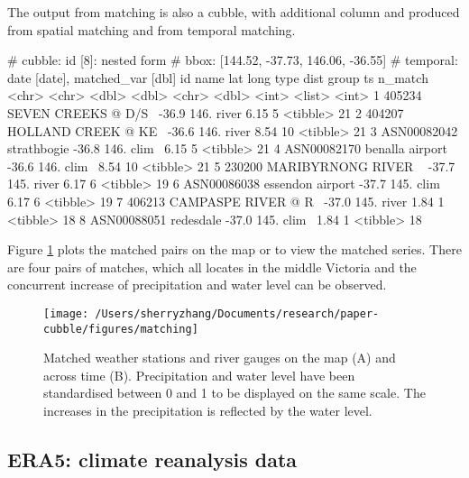 \documentclass[
]{jss}
\begin{document}
The output from matching is also a cubble, with additional column
 and  produced from spatial matching and
 from temporal matching.

\begin{CodeChunk}
\begin{CodeOutput}
# cubble:   id [8]: nested form
# bbox:     [144.52, -37.73, 146.06, -36.55]
# temporal: date [date], matched_var [dbl]
  id          name                  lat  long type   dist group ts       n_match
  <chr>       <chr>               <dbl> <dbl> <chr> <dbl> <int> <list>     <int>
1 405234      SEVEN CREEKS @ D/S~ -36.9  146. river  6.15     5 <tibble>      21
2 404207      HOLLAND CREEK @ KE~ -36.6  146. river  8.54    10 <tibble>      21
3 ASN00082042 strathbogie         -36.8  146. clim~  6.15     5 <tibble>      21
4 ASN00082170 benalla airport     -36.6  146. clim~  8.54    10 <tibble>      21
5 230200      MARIBYRNONG RIVER ~ -37.7  145. river  6.17     6 <tibble>      19
6 ASN00086038 essendon airport    -37.7  145. clim~  6.17     6 <tibble>      19
7 406213      CAMPASPE RIVER @ R~ -37.0  145. river  1.84     1 <tibble>      18
8 ASN00088051 redesdale           -37.0  145. clim~  1.84     1 <tibble>      18
\end{CodeOutput}
\end{CodeChunk}

Figure \ref{fig:matching} plots the matched pairs on the map or to view
the matched series. There are four pairs of matches, which all locates
in the middle Victoria and the concurrent increase of precipitation and
water level can be observed.

\begin{CodeChunk}
\begin{figure}

{\centering \texttt{[image: /Users/sherryzhang/Documents/research/paper-cubble/figures/matching]} 

}

\caption[Matched weather stations and river gauges on the map (A) and across time (B)]{Matched weather stations and river gauges on the map (A) and across time (B). Precipitation and water level have been standardised between 0 and 1 to be displayed on the same scale. The increases in the precipitation is reflected by the water level.}\label{fig:matching}
\end{figure}
\end{CodeChunk}

\hypertarget{era5-climate-reanalysis-data}{%
\subsection{ERA5: climate reanalysis
data}\label{era5-climate-reanalysis-data}}
\end{document}
